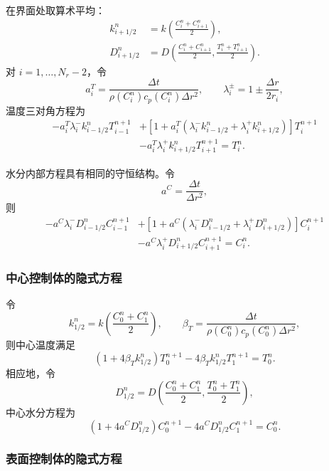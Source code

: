\documentclass[UTF8,a4paper,11pt]{ctexart}
\numberwithin{equation}{section}
\begin{document}
在界面处取算术平均：
\begin{align}
k_{i+1/2}^n
&=k\left(\frac{C_i^n+C_{i+1}^n}{2}\right),\\
D_{i+1/2}^n
&=D\left(\frac{C_i^n+C_{i+1}^n}{2},
\frac{T_i^n+T_{i+1}^n}{2}\right).
\end{align}
对 \(i=1,\ldots,N_r-2\)，令
\[
a_i^T=\frac{\Delta t}{\rho(C_i^n)c_p(C_i^n)\Delta r^2},\qquad
\lambda_i^\pm=1\pm\frac{\Delta r}{2r_i},
\]
温度三对角方程为
\begin{equation}
\begin{aligned}
-a_i^T\lambda_i^-k_{i-1/2}^nT_{i-1}^{n+1}
&+\left[1+a_i^T\left(\lambda_i^-k_{i-1/2}^n+
\lambda_i^+k_{i+1/2}^n\right)\right]T_i^{n+1}\\
&-a_i^T\lambda_i^+k_{i+1/2}^nT_{i+1}^{n+1}=T_i^n.
\end{aligned}
\label{eq:q2-T-inner}
\end{equation}

水分内部方程具有相同的守恒结构。令
\[
a^C=\frac{\Delta t}{\Delta r^2},
\]
则
\begin{equation}
\begin{aligned}
-a^C\lambda_i^-D_{i-1/2}^nC_{i-1}^{n+1}
&+\left[1+a^C\left(\lambda_i^-D_{i-1/2}^n+
\lambda_i^+D_{i+1/2}^n\right)\right]C_i^{n+1}\\
&-a^C\lambda_i^+D_{i+1/2}^nC_{i+1}^{n+1}=C_i^n.
\end{aligned}
\label{eq:q2-C-inner}
\end{equation}

\subsubsection{中心控制体的隐式方程}

令
\[
k_{1/2}^n=k\left(\frac{C_0^n+C_1^n}{2}\right),\qquad
\beta_T=\frac{\Delta t}{\rho(C_0^n)c_p(C_0^n)\Delta r^2},
\]
则中心温度满足
\begin{equation}
\left(1+4\beta_Tk_{1/2}^n\right)T_0^{n+1}
-4\beta_Tk_{1/2}^nT_1^{n+1}=T_0^n.
\label{eq:q2-T-center}
\end{equation}
相应地，令
\[
D_{1/2}^n=D\left(\frac{C_0^n+C_1^n}{2},
\frac{T_0^n+T_1^n}{2}\right),
\]
中心水分方程为
\begin{equation}
\left(1+4a^CD_{1/2}^n\right)C_0^{n+1}
-4a^CD_{1/2}^nC_1^{n+1}=C_0^n.
\label{eq:q2-C-center}
\end{equation}

\subsubsection{表面控制体的隐式方程}
\end{document}
